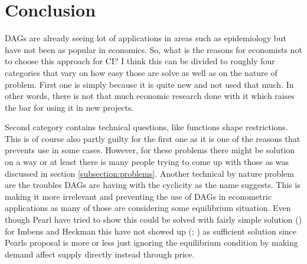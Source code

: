 \documentclass[main=english,12pt,a4paper,pdftex,econ,utf8]{aaltothesis}
\begin{document}
\clearpage

\section{Conclusion}

DAGs are already seeing lot of applications in areas such as epidemiology but have not been as popular in economics. So, what is the reasons for economists not to choose this approach for CI? I think this can be divided to roughly four categories that vary on how easy those are solve as well as on the nature of problem. First one is simply because it is quite new and not used that much. In other words, there is not that much economic research done with it which raises the bar for using it in new projects.

Second category contains technical questions, like functions shape restrictions. This is of course also partly guilty for the first one as it is one of the reasons that prevents use in some cases. However, for these problems there might be solution on a way or at least there is many people trying to come up with those as was discussed in section \ref{subsection:problems}. Another technical by nature problem are the troubles DAGs are having with the cyclicity as the name suggests. This is making it more irrelevant and preventing the use of DAGs in econometric applications as many of those are considering some equilibrium situation. Even though Pearl have tried to show this could be solved with fairly simple solution (\cite{PearlMackenzie18}) for Imbens and Heckman this have not showed up (\cite{imbes2020}; \cite{Heckman2015}) as sufficient solution since Pearls proposal is more or less just ignoring the equilibrium condition by making demand affect supply directly instead through price.
\end{document}
